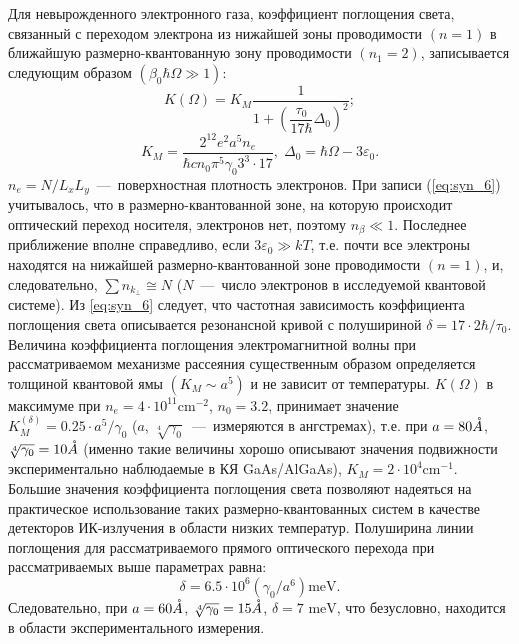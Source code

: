 Для невырожденного электронного газа, коэффициент поглощения света, связанный с переходом электрона из нижайшей зоны проводимости $(n=1)$ в ближайшую размерно-квантованную зону проводимости $(n_1=2)$, записывается следующим образом $(\beta _0\hbar \Omega \gg 1)$:
\begin{equation} \label{eq:syn_6}
K(\Omega) = K_M \frac{1}{1+\left(\dfrac{\tau_0 }{17 \hbar} \Delta_0 \right)^2 } ;
\end{equation} 
\[
K_M =\frac{2^{12} e^2 a^5 n_e }{\hbar cn_0 \pi^5 \gamma_0 3^3 \cdot 17}, \;
\Delta_0 =\hbar \Omega -3\varepsilon_0.
\]
$n_e =N/L_x L_y $~---~поверхностная плотность электронов. При записи (\ref{eq:syn_6}) учитывалось, что в размерно-квантованной зоне, на которую происходит оптический переход носителя, электронов нет, поэтому $n_{\beta } \ll 1$. Последнее приближение вполне справедливо, если  $3\varepsilon_0 \gg kT$, т.е. почти все электроны находятся на нижайшей размерно-квантованной зоне проводимости $(n=1)$, и, следовательно, $\sum n_{k_{\bot } } \cong N$ ($N$~---~число электронов в исследуемой квантовой системе). Из \eqref{eq:syn_6} следует, что частотная зависимость коэффициента поглощения света описывается резонансной кривой с полушириной  $\delta =17\cdot 2\hbar /\tau_0 $. Величина коэффициента поглощения электромагнитной волны при рассматриваемом механизме рассеяния существенным образом определяется толщиной квантовой ямы $\left(K_M \sim a^5 \right)$ и не зависит от температуры. $K\left(\Omega \right)$  в максимуме при $n_e =4\cdot 10^{11} \text{cm}^{-2} $, $n_0 = 3.2$,   принимает значение   $K_M^{\left(\delta \right)} =0.25\cdot a^5 /\gamma_0 $ ($a$, $\sqrt[4]{\gamma_0}$~--–~измеряются в ангстремах), т.е. при  $a = 80 \AA$,  $\sqrt[4]{\gamma_0} = 10 \AA$ (именно такие величины хорошо описывают значения подвижности   экспериментально наблюдаемые в КЯ GaAs/AlGaAs), $K_M =2\cdot 10^4 \text{cm}^{-1} $. Большие значения коэффициента поглощения света позволяют надеяться на практическое использование таких размерно-квантованных систем в качестве детекторов ИК-излучения в области низких температур. Полуширина линии поглощения для рассматриваемого прямого оптического перехода при рассматриваемых выше параметрах равна:
\[
\delta =6.5\cdot 10^6 \left(\gamma_0 /a^6 \right)\text{meV}.
\]
Следовательно, при  $a = 60 \AA$,  $\sqrt[4]{\gamma_0} = 15 \AA$,  $\delta = 7 \text{ meV}$, что безусловно, находится в области экспериментального измерения.

